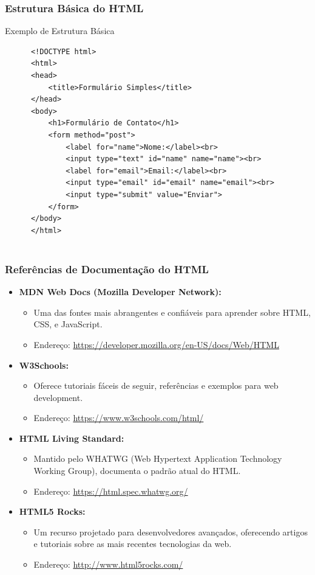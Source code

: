 \begin{frame}[fragile]
  \frametitle{Estrutura Básica do HTML}
  \begin{block}{Exemplo de Estrutura Básica}
    \small
    \begin{verbatim}
      <!DOCTYPE html>
      <html>
      <head>
          <title>Formulário Simples</title>
      </head>
      <body>
          <h1>Formulário de Contato</h1>
          <form method="post">
              <label for="name">Nome:</label><br>
              <input type="text" id="name" name="name"><br>
              <label for="email">Email:</label><br>
              <input type="email" id="email" name="email"><br>
              <input type="submit" value="Enviar">
          </form>
      </body>
      </html>
      
    \end{verbatim}
  \end{block}
\end{frame}
\begin{frame}[fragile]
  \frametitle{Referências de Documentação do HTML}
  \begin{itemize}
    \item \textbf{MDN Web Docs (Mozilla Developer Network):}
      \begin{itemize}
        \item Uma das fontes mais abrangentes e confiáveis para aprender sobre HTML, CSS, e JavaScript.
        \item Endereço: \url{https://developer.mozilla.org/en-US/docs/Web/HTML}
      \end{itemize}
    \item \textbf{W3Schools:}
      \begin{itemize}
        \item Oferece tutoriais fáceis de seguir, referências e exemplos para web development.
        \item Endereço: \url{https://www.w3schools.com/html/}
      \end{itemize}
    \item \textbf{HTML Living Standard:}
      \begin{itemize}
        \item Mantido pelo WHATWG (Web Hypertext Application Technology Working Group), documenta o padrão atual do HTML.
        \item Endereço: \url{https://html.spec.whatwg.org/}
      \end{itemize}
    \item \textbf{HTML5 Rocks:}
      \begin{itemize}
        \item Um recurso projetado para desenvolvedores avançados, oferecendo artigos e tutoriais sobre as mais recentes tecnologias da web.
        \item Endereço: \url{http://www.html5rocks.com/}
      \end{itemize}
  \end{itemize}
\end{frame}


